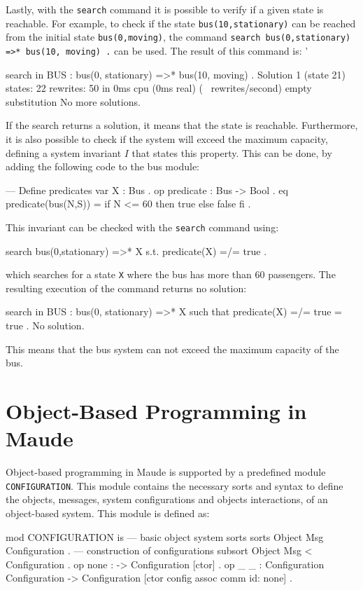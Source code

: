 Lastly, with the \texttt{search} command it is possible to verify if a given state is reachable. For example, to check if the state \texttt{bus(10,stationary)} can be reached from the initial state \texttt{bus(0,moving)}, the command \texttt{search bus(0,stationary) =>* bus(10, moving) .}  can be used. The result of this command is:
'\\
\begin{maude2}
search in BUS : bus(0, stationary) =>* bus(10, moving) .
Solution 1 (state 21)
states: 22  rewrites: 50 in 0ms cpu (0ms real) (~ rewrites/second)
empty substitution
No more solutions.
\end{maude2}
If the search returns a solution, it means that the state is reachable. Furthermore, it is also possible to check if the system will exceed the maximum capacity, defining a system invariant $I$ that states this property. This can be done, by adding the following code to the bus module:
\\
\begin{maude}
--- Define predicates
  var X : Bus .
  op predicate : Bus -> Bool .
  eq predicate(bus(N,S)) = if N <= 60 then true else false fi .
\end{maude}
This invariant can be checked with the \texttt{search} command using:
\\
\begin{maude2}
search bus(0,stationary) =>* X  s.t. predicate(X) =/= true .
\end{maude2}
which searches for a state \texttt{X} where the bus has more than 60 passengers. The resulting execution of the command returns no solution: \\
\begin{maude2}
search in BUS : bus(0, stationary) =>* 
                X such that predicate(X) =/= true = true .
No solution.
\end{maude2}
This means that the bus system can not exceed the maximum capacity of the bus.
\section{Object-Based Programming in Maude}
Object-based programming in Maude \cite{MaudeManual, Lecture3, PeterMaude} is supported by a predefined module \texttt{CONFIGURATION}. This module contains the necessary sorts and syntax to define the objects, messages, system configurations and objects interactions, of an object-based system. This module is defined as:
\\
\begin{maude}
mod CONFIGURATION is
  --- basic object system sorts
  sorts Object Msg Configuration .
  --- construction of configurations
  subsort Object Msg < Configuration .
  op none : -> Configuration [ctor] .
  op _ _ : Configuration Configuration -> Configuration
           [ctor config assoc comm id: none] .
\end{maude}

